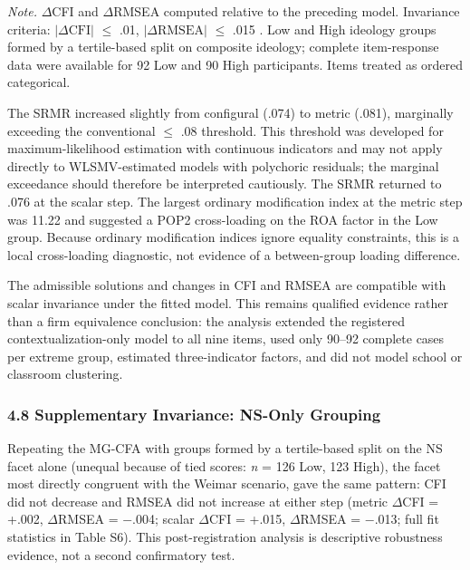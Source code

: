 \documentclass[
  12pt,
]{article}
\begin{document}
\emph{Note.} \(\Delta\)CFI and \(\Delta\)RMSEA computed relative to the preceding model. Invariance criteria: $|\Delta\text{CFI}|$ \(\leq\) .01, $|\Delta\text{RMSEA}|$ \(\leq\) .015 \citep{Chen2007}. Low and High ideology groups formed by a tertile-based split on composite ideology; complete item-response data were available for 92 Low and 90 High participants. Items treated as ordered categorical.

The SRMR increased slightly from configural (.074) to metric (.081),
marginally exceeding the conventional \(\leq\) .08 threshold. This
threshold was developed for maximum-likelihood estimation with
continuous indicators and may not apply directly to WLSMV-estimated
models with polychoric residuals; the marginal exceedance should
therefore be interpreted cautiously. The SRMR returned to .076 at the
scalar step. The largest ordinary modification index at the metric step
was 11.22 and suggested a POP2 cross-loading on the ROA factor in the
Low group. Because ordinary modification indices ignore equality
constraints, this is a local cross-loading diagnostic, not evidence of
a between-group loading difference.

The admissible solutions and changes in CFI and RMSEA are compatible
with scalar invariance under the fitted model. This remains qualified
evidence rather than a firm equivalence conclusion: the analysis
extended the registered contextualization-only model to all nine items,
used only 90--92 complete cases per extreme
group, estimated three-indicator factors, and did not model school or
classroom clustering.

\hypertarget{supplementary-invariance-ns-only-grouping}{%
\subsubsection{4.8 Supplementary Invariance: NS-Only Grouping}\label{supplementary-invariance-ns-only-grouping}}

Repeating the MG-CFA with groups formed by a tertile-based split on the NS
facet alone (unequal because of tied scores: \emph{n} = 126 Low, 123 High),
the facet most directly congruent with the Weimar scenario, gave the same
pattern: CFI did not decrease and RMSEA did not increase at either step
(metric \(\Delta\)CFI = +.002, \(\Delta\)RMSEA = $-$.004; scalar
\(\Delta\)CFI = +.015, \(\Delta\)RMSEA = $-$.013; full fit statistics in
Table S6). This post-registration analysis is descriptive robustness evidence,
not a second confirmatory test.
\end{document}
